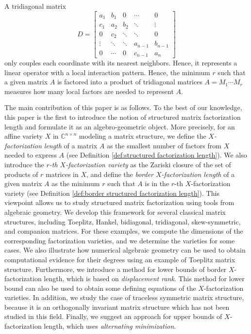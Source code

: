\documentclass[reqno]{amsart}
\theoremstyle{definition}
\numberwithin{equation}{section}
\begin{document}
A tridiagonal matrix
\begin{equation*}
    D = 
    \begin{bmatrix}
        a_1 & b_1 & 0 & \cdots & 0\\
        c_1 & a_2 & b_2 & \ddots & \vdots\\
        0 & c_2 & \ddots & \ddots & 0\\
        \vdots & \ddots & \ddots & a_{n-1} & b_{n-1}\\
        0 & \cdots & 0 & c_{n-1} & a_n
    \end{bmatrix}
\end{equation*}
only couples each coordinate with its nearest neighbors. Hence, it represents a linear operator with a local interaction pattern.
Hence, the minimum $r$ such that a given matrix $A$ is factored into a product of tridiagonal matrices $A=M_1\cdots M_r$ measures how many local factors are needed to represent $A$. 

The main contribution of this paper is as follows. To the best of our knowledge, this paper is the first to introduce the notion of structured matrix factorization length and formulate it as an algebro-geometric object. More precisely, for an affine variety $X$ in $\mathbb{C}^{n \times n}$ modeling a matrix structure, we define the \emph{$X$-factorization length} of a matrix $A$ as the smallest number of factors from $X$ needed to express $A$ (see Definition \ref{def:structured factorization length}). We also introduce the \emph{$r$-th $X$-factorization variety} as the Zariski closure of the set of products of $r$ matrices in $X$, and define the \emph{border $X$-factorization length} of a given matrix $A$ as the minimum $r$ such that $A$ is in the $r$-th $X$-factorization variety (see Definition \ref{def:border structured factorization length}). This viewpoint allows us to study structured matrix factorization using tools from algebraic geometry. We develop this framework for several classical matrix structures, including Toeplitz, Hankel, bidiagonal, tridiagonal, skew-symmetric, and companion matrices. For these examples, we compute the dimensions of the corresponding factorization varieties, and we determine the varieties for some cases. We also illustrate how numerical algebraic geometry can be used to obtain computational evidence for their degrees using an example of Toeplitz matrix structure. Furthermore, we introduce a method for lower bounds of border $X$-factorization length, which is based on \emph{displacement rank}. This method for lower bound can also be used to obtain some defining equations of the $X$-factorization varieties. In addition, we study the case of traceless symmetric matrix structure, because it is an orthogonally invariant matrix structure which has not been studied in this field. Finally, we suggest an approach for upper bounds of $X$-factorization length, which uses \emph{alternating minimization}.
\end{document}
